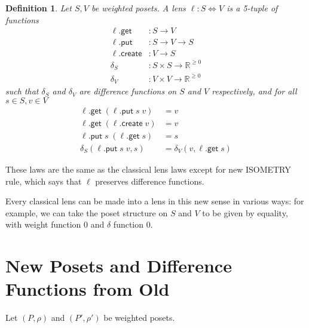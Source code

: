 \documentclass[acmsmall,review,anonymous]{acmart}\settopmatter{printfolios=true,printccs=false,printacmref=false}
\newtheorem{definition}{Definition}
\newcommand{\kw}[1]{\ensuremath{\mathsf{#1}}}
\newcommand{\get}{\ensuremath{\kw{get}}}
\newcommand{\pput}{\ensuremath{\kw{put}}}
\newcommand{\create}{\ensuremath{\kw{create}}}
\begin{document}
\begin{definition}
Let $S, V$ be weighted posets. A lens $\ell : S \Leftrightarrow V$ is a
5-tuple of functions
\begin{align*}
\ell.\get &: S \longrightarrow V\\
\ell.\pput &: S \longrightarrow V \longrightarrow S\\
\ell.\create &: V \longrightarrow S\\
\delta_S &: S \times S \longrightarrow \mathbb{R}^{\geq 0}\\
\delta_V &: V \times V \longrightarrow \mathbb{R}^{\geq 0}
\end{align*}
such that $\delta_S$ and $\delta_V$ are difference functions on $S$ and $V$
respectively, and for all $s \in S, v \in V$
\begin{align*}
\ell.\get \; (\ell.\pput \; s \; v) &= v \tag{PUTGET}\\
\ell.\get \; (\ell.\create \; v) &= v \tag{CREATEGET}\\
\ell.\pput \; s \; (\ell.\get \; s) &= s \tag{GETPUT}\\
\delta_S(\ell.\pput \; s \; v, s) &= \delta_V(v, \ell.\get \; s) \tag{ISOMETRY}
\end{align*}
\end{definition}
These laws are the same as the classical lens laws except for new ISOMETRY rule,
which says that $\ell$ preserves difference functions.

Every classical lens can be made into a lens in this new sense in various
ways: for example, we can take the poset structure on $S$
and $V$ to be given by equality, with weight function 0 and $\delta$ function 0.

\section{New Posets and Difference Functions from Old}
Let $(P, \rho)$ and $(P', \rho')$ be weighted posets.
\end{document}
